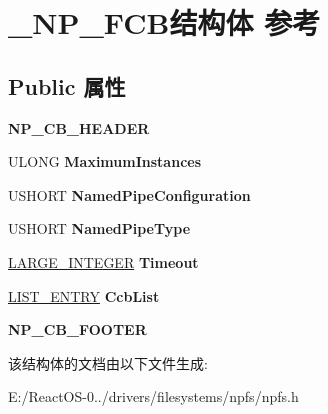 \hypertarget{struct___n_p___f_c_b}{}\section{\+\_\+\+N\+P\+\_\+\+F\+C\+B结构体 参考}
\label{struct___n_p___f_c_b}
\subsection*{Public 属性}
\begin{DoxyCompactItemize}
\item 
\mbox{\label{struct___n_p___f_c_b_a44e4685294da2332f2c9afc75d7251ad}} 
{\bfseries N\+P\+\_\+\+C\+B\+\_\+\+H\+E\+A\+D\+ER}
\item 
\mbox{\label{struct___n_p___f_c_b_a5789343a1bcec3533fcd03b6bcd7eb83}} 
U\+L\+O\+NG {\bfseries Maximum\+Instances}
\item 
\mbox{\label{struct___n_p___f_c_b_acd45b6e2fab7251c48fe9ab7491e6988}} 
U\+S\+H\+O\+RT {\bfseries Named\+Pipe\+Configuration}
\item 
\mbox{\label{struct___n_p___f_c_b_a75cf62a6e1e46b78ffe24b2f835e47ac}} 
U\+S\+H\+O\+RT {\bfseries Named\+Pipe\+Type}
\item 
\mbox{\label{struct___n_p___f_c_b_a48bcc6c756485dd35500b1378610f613}} 
\hyperlink{union___l_a_r_g_e___i_n_t_e_g_e_r}{L\+A\+R\+G\+E\+\_\+\+I\+N\+T\+E\+G\+ER} {\bfseries Timeout}
\item 
\mbox{\label{struct___n_p___f_c_b_a3060b0c3e600bfaf2284eebb2bba37e8}} 
\hyperlink{struct___l_i_s_t___e_n_t_r_y}{L\+I\+S\+T\+\_\+\+E\+N\+T\+RY} {\bfseries Ccb\+List}
\item 
\mbox{\label{struct___n_p___f_c_b_ae92e0095db8c013c2784cfde74a7d5fc}} 
{\bfseries N\+P\+\_\+\+C\+B\+\_\+\+F\+O\+O\+T\+ER}
\end{DoxyCompactItemize}


该结构体的文档由以下文件生成\+:\begin{DoxyCompactItemize}
\item 
E\+:/\+React\+O\+S-\/0../drivers/filesystems/npfs/npfs.\+h\end{DoxyCompactItemize}
